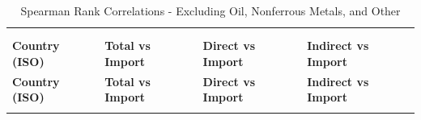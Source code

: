 \begin{longtable}{p{5cm}p{3cm}p{3cm}p{5cm}}
\centering
\caption{Spearman Rank Correlations - Excluding Oil, Nonferrous Metals, and Other} \\
\label{tab:Spearman_Rank_Correlations__Excluding_Oil_Nonferrous_Metals_and_Other} \\
\toprule
\textbf{Country (ISO)} & \textbf{Total vs Import} & \textbf{Direct vs Import} & \textbf{Indirect vs Import} \\
\midrule
\endfirsthead

\toprule
\textbf{Country (ISO)} & \textbf{Total vs Import} & \textbf{Direct vs Import} & \textbf{Indirect vs Import} \\
\midrule
\endhead

\bottomrule
\endfoot

\bottomrule
\endlastfoot


\end{longtable}
